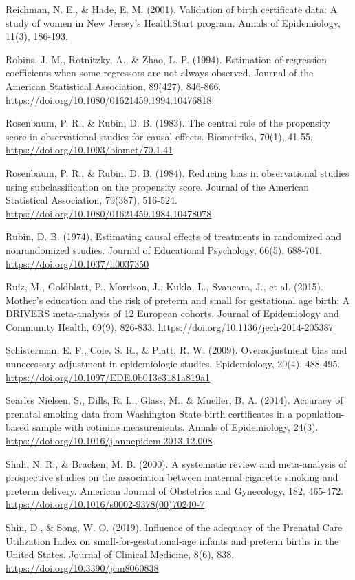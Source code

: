 \documentclass[11pt,letterpaper]{article}
\begin{document}
{Reichman, N. E., \& Hade, E. M. (2001). Validation of birth certificate data: A study of women in New Jersey's HealthStart program. Annals of Epidemiology, 11(3), 186-193.

Robins, J. M., Rotnitzky, A., \& Zhao, L. P. (1994). Estimation of regression coefficients when some regressors are not always observed. Journal of the American Statistical Association, 89(427), 846-866. \url{https://doi.org/10.1080/01621459.1994.10476818}

Rosenbaum, P. R., \& Rubin, D. B. (1983). The central role of the propensity score in observational studies for causal effects. Biometrika, 70(1), 41-55. \url{https://doi.org/10.1093/biomet/70.1.41}

Rosenbaum, P. R., \& Rubin, D. B. (1984). Reducing bias in observational studies using subclassification on the propensity score. Journal of the American Statistical Association, 79(387), 516-524. \url{https://doi.org/10.1080/01621459.1984.10478078}

Rubin, D. B. (1974). Estimating causal effects of treatments in randomized and nonrandomized studies. Journal of Educational Psychology, 66(5), 688-701. \url{https://doi.org/10.1037/h0037350}

Ruiz, M., Goldblatt, P., Morrison, J., Kukla, L., Svancara, J., et al. (2015). Mother's education and the risk of preterm and small for gestational age birth: A DRIVERS meta-analysis of 12 European cohorts. Journal of Epidemiology and Community Health, 69(9), 826-833. \url{https://doi.org/10.1136/jech-2014-205387}

Schisterman, E. F., Cole, S. R., \& Platt, R. W. (2009). Overadjustment bias and unnecessary adjustment in epidemiologic studies. Epidemiology, 20(4), 488-495. \url{https://doi.org/10.1097/EDE.0b013e3181a819a1}

Searles Nielsen, S., Dills, R. L., Glass, M., \& Mueller, B. A. (2014). Accuracy of prenatal smoking data from Washington State birth certificates in a population-based sample with cotinine measurements. Annals of Epidemiology, 24(3). \url{https://doi.org/10.1016/j.annepidem.2013.12.008}

Shah, N. R., \& Bracken, M. B. (2000). A systematic review and meta-analysis of prospective studies on the association between maternal cigarette smoking and preterm delivery. American Journal of Obstetrics and Gynecology, 182, 465-472. \url{https://doi.org/10.1016/s0002-9378(00)70240-7}

Shin, D., \& Song, W. O. (2019). Influence of the adequacy of the Prenatal Care Utilization Index on small-for-gestational-age infants and preterm births in the United States. Journal of Clinical Medicine, 8(6), 838. \url{https://doi.org/10.3390/jcm8060838}

}
\end{document}
